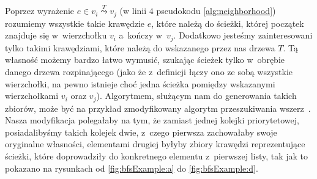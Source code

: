 Poprzez wyrażenie $e \in v_{i} \overset{T}{\leadsto} v_{j}$ (w linii $4$ pseudokodu \ref{alg:neighborhood}) rozumiemy wszystkie takie krawędzie $e$, które należą do ścieżki, której początek znajduje się w~wierzchołku $v_{i}$ a~kończy w~$v_{j}$.
Dodatkowo jesteśmy zainteresowani tylko takimi krawędziami, które należą do wskazanego przez nas drzewa $T$.
Tą własność możemy bardzo łatwo wymusić, szukając ścieżek tylko w~obrębie danego drzewa rozpinającego (jako że z~definicji łączy ono ze sobą wszystkie wierzchołki, na pewno istnieje choć jedna ścieżka pomiędzy wskazanymi wierzchołkami $v_{i}$ oraz $v_{j}$).
Algorytmem, służącym nam do generowania takich zbiorów, może być na przykład zmodyfikowany algorytm przeszukiwania wszerz~\cite[$604$--$606$]{Cormen}.
Nasza modyfikacja polegałaby na tym, że zamiast jednej kolejki priorytetowej, posiadalibyśmy takich kolejek dwie, z~czego pierwsza zachowałaby swoje oryginalne własności, elementami drugiej byłyby zbiory krawędzi reprezentujące ścieżki, które doprowadziły do konkretnego elementu z~pierwszej listy, tak jak to pokazano na rysunkach od \ref{fig:bfsExample:a} do \ref{fig:bfsExample:d}.

